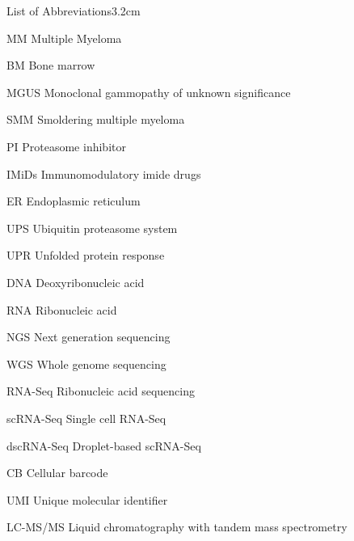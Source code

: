 \begin{mclistof}{List of Abbreviations}{3.2cm}

\item[MM] Multiple Myeloma

\item[BM] Bone marrow

\item[MGUS] Monoclonal gammopathy of unknown significance

\item[SMM] Smoldering multiple myeloma

\item[PI] Proteasome inhibitor

\item[IMiDs] Immunomodulatory imide drugs

\item[ER] Endoplasmic reticulum

\item[UPS] Ubiquitin proteasome system

\item[UPR] Unfolded protein response

\item[DNA] Deoxyribonucleic acid

\item[RNA] Ribonucleic acid

\item[NGS] Next generation sequencing

\item[WGS] Whole genome sequencing

\item[RNA-Seq] Ribonucleic acid sequencing

\item[scRNA-Seq] Single cell RNA-Seq

\item[dscRNA-Seq] Droplet-based scRNA-Seq

\item[CB] Cellular barcode

\item[UMI] Unique molecular identifier

\item[LC-MS/MS] Liquid chromatography with tandem mass spectrometry


\end{mclistof} 

